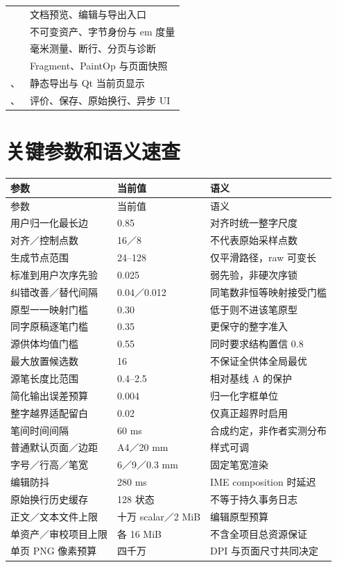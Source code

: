 \documentclass[UTF8,a4paper,11pt,fontset=fandol]{ctexart}
\begin{document}
\begin{longtable}{L{64mm}L{80mm}}
 & 文档预览、编辑与导出入口\\
 & 不可变资产、字节身份与 em 度量\\
 & 毫米测量、断行、分页与诊断\\
 & Fragment、PaintOp 与页面快照\\
、 & 静态导出与 Qt 当前页显示\\
、 & 评价、保存、原始换行、异步 UI\\
\bottomrule
\end{longtable}

\section{关键参数和语义速查}
\begin{longtable}{L{53mm}L{30mm}L{61mm}}
\toprule 参数 & 当前值 & 语义\\\midrule\endfirsthead
\toprule 参数 & 当前值 & 语义\\\midrule\endhead
用户归一化最长边 & 0.85 & 对齐时统一整字尺度\\
对齐／控制点数 & 16／8 & 不代表原始采样点数\\
生成节点范围 & 24--128 & 仅平滑路径，raw 可变长\\
标准到用户次序先验 & 0.025 & 弱先验，非硬次序锁\\
纠错改善／替代间隔 & 0.04／0.012 & 同笔数非恒等映射接受门槛\\
原型一一映射门槛 & 0.30 & 低于则不进该笔原型\\
同字原稿逐笔门槛 & 0.35 & 更保守的整字准入\\
源供体均值门槛 & 0.55 & 同时要求结构置信 0.8\\
最大放置候选数 & 16 & 不保证全供体全局最优\\
源笔长度比范围 & 0.4--2.5 & 相对基线 A 的保护\\
简化输出误差预算 & 0.004 & 归一化字框单位\\
整字越界适配留白 & 0.02 & 仅真正超界时启用\\
笔间时间间隔 & 60 ms & 合成约定，非作者实测分布\\
普通默认页面／边距 & A4／20 mm & 样式可调\\
字号／行高／笔宽 & 6／9／0.3 mm & 固定笔宽渲染\\
编辑防抖 & 280 ms & IME composition 时延迟\\
原始换行历史缓存 & 128 状态 & 不等于持久事务日志\\
正文／文本文件上限 & 十万 scalar／2 MiB & 编辑原型预算\\
单资产／审校项目上限 & 各 16 MiB & 不含全项目总资源保证\\
单页 PNG 像素预算 & 四千万 & DPI 与页面尺寸共同决定\\
\bottomrule
\end{longtable}
\end{document}
